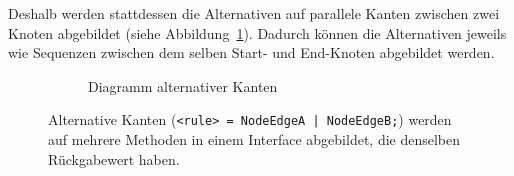 \documentclass[../InterneDSLs.tex]{subfiles}
\begin{document}
Deshalb werden stattdessen die Alternativen auf parallele Kanten zwischen zwei Knoten abgebildet (siehe Abbildung~\ref{FIG:DiagramAlternativeNode}). Dadurch können die Alternativen jeweils wie Sequenzen zwischen dem selben Start- und End-Knoten abgebildet werden.
\begin{figure}[ht]
\centering
  \begin{subfigure}[c]{0.49\textwidth}
    \caption{Diagramm alternativer Kanten}
    \label{FIG:DiagramAlternativeNode}
  \end{subfigure}
  \begin{subfigure}[c]{0.49\textwidth}
    
  \end{subfigure}
  \caption[Abbildung alternativer Kanten Variante 2]{Alternative Kanten (\texttt{<rule> = NodeEdgeA | NodeEdgeB;}) werden auf mehrere Methoden in einem Interface abgebildet, die denselben Rückgabewert haben.}
  \label{FIG:AlternativeNode}
\end{figure}
\end{document}
